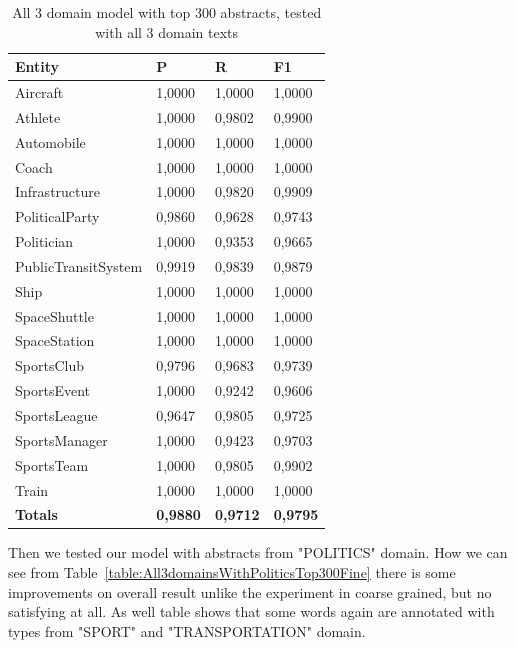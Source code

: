 \documentclass[thesis=M,english]{FITthesis}[2018/05/30]
\begin{document}
\begin{table}[H]\centering
		\begin{tabular}{|l|l|l|l|}
			\hline {\textbf{Entity}} & {\textbf{P}} & {\textbf{R}} & {\textbf{F1}}\\\hline
				Aircraft & 1,0000 & 1,0000 & 1,0000\\
				Athlete & 1,0000 & 0,9802 & 0,9900\\
				Automobile & 1,0000 & 1,0000 & 1,0000\\ 
				Coach & 1,0000 & 1,0000 & 1,0000\\
				Infrastructure & 1,0000 & 0,9820 & 0,9909\\
				PoliticalParty & 0,9860 & 0,9628 & 0,9743\\
				Politician & 1,0000 & 0,9353 & 0,9665\\
				PublicTransitSystem & 0,9919 & 0,9839 & 0,9879\\
				Ship & 1,0000 & 1,0000 & 1,0000\\
				SpaceShuttle & 1,0000 & 1,0000 & 1,0000\\
				SpaceStation & 1,0000 & 1,0000 & 1,0000\\ 
				SportsClub & 0,9796 & 0,9683 & 0,9739\\
				SportsEvent & 1,0000 & 0,9242 & 0,9606\\
				SportsLeague & 0,9647 & 0,9805 & 0,9725\\
				SportsManager & 1,0000 & 0,9423 & 0,9703\\
				SportsTeam & 1,0000 & 0,9805 & 0,9902\\
				Train & 1,0000 & 1,0000 & 1,0000\\\hline
				\textbf{Totals} & \textbf{0,9880} & \textbf{0,9712} & \textbf{0,9795}\\\hline
		\end{tabular}
		\caption{All 3 domain model with top 300 abstracts, tested with all 3 domain texts \label{table:All3domainsWithAll3DomainsTop300Fine}}
	\end{table}

Then we tested our model with abstracts from "POLITICS" domain. How we can see from Table~\ref{table:All3domainsWithPoliticsTop300Fine} there is some improvements on overall result unlike the experiment in coarse grained, but no satisfying at all. As well table shows that some words again are annotated with types from "SPORT" and "TRANSPORTATION" domain.
\end{document}
